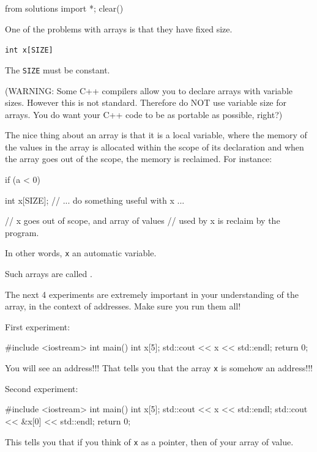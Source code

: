 \begin{python0}
from solutions import *; clear()
\end{python0}

One of the problems with arrays is that they have fixed size.

\verb!int x[SIZE]!

The \texttt{SIZE} must be constant.

(WARNING: Some C++ compilers allow you to declare arrays with variable sizes. However this is not standard. Therefore do NOT use variable size for arrays. You do want your C++ code to be as portable as possible, right?)

The nice thing about an array is that it is a local variable, where the memory of the values in the array is allocated within the scope of its declaration and when the array goes out of the scope, the memory is reclaimed. For instance:

\begin{consolethree}[escapeinside=||]
if (a < 0)
{
    int x[SIZE];
    // ... do something useful with x ...

} // x goes out of scope, and array of values
  // used by x is reclaim by the program.
\end{consolethree}

In other words, \texttt{x} an automatic variable.

Such arrays are called .

The next 4 experiments are extremely important in your understanding of the array, in the context of addresses. Make sure you run them all!

First experiment:

\begin{consolethree}[escapeinside=||]
#include <iostream>
int main()
{
    int x[5];
    std::cout << x << std::endl;
    return 0;
}
\end{consolethree}

You will see an address!!! That tells you that the array \texttt{x} is somehow an address!!!

Second experiment:

\begin{consolethree}[escapeinside=||]
#include <iostream>
int main()
{
    int x[5];
    std::cout << x << std::endl;
    std::cout << &x[0] << std::endl;
    return 0;
}
\end{consolethree}

This tells you that if you think of \texttt{x} as a pointer, then \texttt{} of your array of value.

